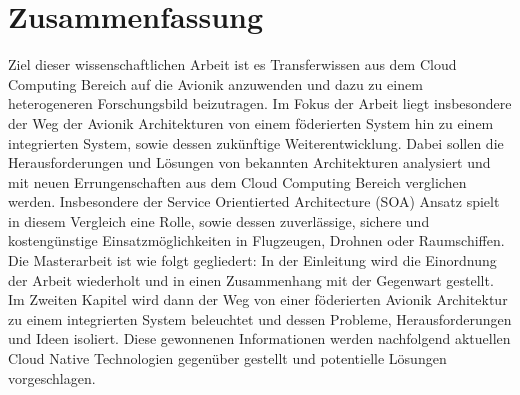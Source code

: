 \documentclass[titlepage]{report}
\begin{document}
\chapter*{Zusammenfassung}
Ziel dieser wissenschaftlichen Arbeit ist es Transferwissen aus dem Cloud Computing Bereich auf die Avionik
anzuwenden und dazu zu einem heterogeneren Forschungsbild beizutragen. Im Fokus der Arbeit liegt insbesondere
der Weg der Avionik Architekturen von einem föderierten System hin zu einem integrierten System, sowie dessen
zukünftige Weiterentwicklung. Dabei sollen die Herausforderungen und Lösungen von bekannten Architekturen
analysiert und mit neuen Errungenschaften aus dem Cloud Computing Bereich verglichen werden. Insbesondere
der Service Orientierted Architecture (SOA) Ansatz spielt in diesem Vergleich eine Rolle, sowie dessen
zuverlässige, sichere und kostengünstige Einsatzmöglichkeiten in Flugzeugen, Drohnen oder Raumschiffen.
Die Masterarbeit ist wie folgt gegliedert: In der Einleitung wird die Einordnung der Arbeit wiederholt
und in einen Zusammenhang mit der Gegenwart gestellt. Im Zweiten Kapitel wird dann der Weg von einer föderierten
Avionik Architektur zu einem integrierten System beleuchtet und dessen Probleme, Herausforderungen
und Ideen isoliert. Diese gewonnenen Informationen werden nachfolgend aktuellen Cloud Native Technologien
gegenüber gestellt und potentielle Lösungen vorgeschlagen.

\tableofcontents
\end{document}
